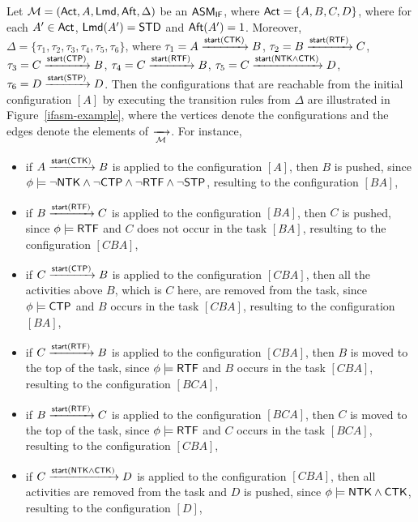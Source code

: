 \begin{example}
	Let ${\mathcal{M} } = ({\sf Act},A,{\sf Lmd},{\sf Aft},\Delta)$ be an $\textsf{ASM}_\textsf{IF}$, where ${\sf Act} = \{A,B,C,D\}$, where for each $A'\in{\sf Act}$, ${\sf Lmd}(A') = \mathsf{STD}$ and ${\sf Aft}(A') = 1$. 
	Moreover, $\Delta = \{\tau_1, \tau_2, \tau_3, \tau_4, \tau_5, \tau_6\}$, where 
	$\tau_1 = A \xrightarrow{{\mathsf{start} }({\sf CTK})} B$,
	$\tau_2 = B \xrightarrow{{\mathsf{start} }({\sf RTF})} C$,
	$\tau_3 = C \xrightarrow{{\mathsf{start} }({\sf CTP})} B$,
	$\tau_4 = C \xrightarrow{{\mathsf{start} }({\sf RTF})} B$,
	$\tau_5 = C \xrightarrow{{\mathsf{start} }({\sf NTK}\wedge{\sf CTK})} D$,
	$\tau_6 = D \xrightarrow{{\mathsf{start} }({\sf STP})} D$.
	Then the configurations that are reachable from the initial configuration $[A]$ by executing the transition rules from $\Delta$ are illustrated in Figure~\ref{ifasm-example}, where the vertices denote the configurations and the edges denote the elements of $\xrightarrow[{\mathcal{M} }]{}$. 
	For instance, 
	\begin{itemize}
		\item if $A \xrightarrow{{\mathsf{start} }({\sf CTK})} B$ is applied to the configuration $[A]$, then $B$ is pushed, since $\phi\models\neg{\sf NTK} \wedge \neg {\sf CTP} \wedge \neg {\sf RTF} \wedge \neg {\sf STP}$, resulting to the configuration $[BA]$,
		\item if $B \xrightarrow{{\mathsf{start} }({\sf RTF})} C$ is applied to the configuration $[BA]$, then $C$ is pushed, since $\phi\models{\sf RTF}$ and $C$ does not occur in the task $[BA]$, resulting to the configuration $[CBA]$,
		\item if $C \xrightarrow{{\mathsf{start} }({\sf CTP})} B$ is applied to the configuration $[CBA]$, then all the activities above $B$, which is $C$ here, are removed from the task, since $\phi\models{\sf CTP}$ and $B$ occurs in the task $[CBA]$, resulting to the configuration $[BA]$,
		\item if $C \xrightarrow{{\mathsf{start} }({\sf RTF})} B$ is applied to the configuration $[CBA]$, then $B$ is moved to the top of the task, since $\phi\models{\sf RTF}$ and $B$ occurs in the task $[CBA]$, resulting to the configuration $[BCA]$,
		\item if $B \xrightarrow{{\mathsf{start} }({\sf RTF})} C$ is applied to the configuration $[BCA]$, then $C$ is moved to the top of the task, since $\phi\models{\sf RTF}$ and $C$ occurs in the task $[BCA]$, resulting to the configuration $[CBA]$,
		\item if $C \xrightarrow{{\mathsf{start} }({\sf NTK}\wedge{\sf CTK})} D$ is applied to the configuration $[CBA]$, then all activities are removed from the task and $D$ is pushed, since $\phi\models{\sf NTK}\wedge{\sf CTK}$, resulting to the configuration $[D]$,

\end{itemize}
\end{example}
